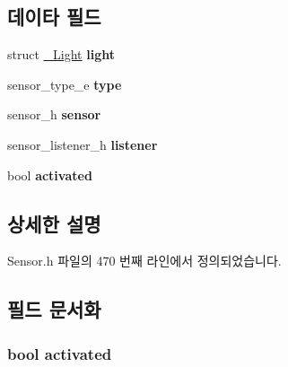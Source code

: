 \subsection*{데이타 필드}
\begin{DoxyCompactItemize}
\item 
\hypertarget{struct__LightExtend_ac99fe442698fe6dee34b12dae4f856b3}{struct \hyperlink{struct__Light}{\-\_\-\-Light} {\bfseries light}}\label{struct__LightExtend_ac99fe442698fe6dee34b12dae4f856b3}

\item 
\hypertarget{struct__LightExtend_abffb09766da2fc510a79bb51f82a36e1}{sensor\-\_\-type\-\_\-e {\bfseries type}}\label{struct__LightExtend_abffb09766da2fc510a79bb51f82a36e1}

\item 
\hypertarget{struct__LightExtend_a5bae9b7801bc3808411925cde81d3f26}{sensor\-\_\-h {\bfseries sensor}}\label{struct__LightExtend_a5bae9b7801bc3808411925cde81d3f26}

\item 
\hypertarget{struct__LightExtend_aa977dfb866b24fd7d9a20a9a01b2fd1f}{sensor\-\_\-listener\-\_\-h {\bfseries listener}}\label{struct__LightExtend_aa977dfb866b24fd7d9a20a9a01b2fd1f}

\item 
\hypertarget{struct__LightExtend_a73e9fa0c3543560192f38a8ab6a78c47}{bool {\bfseries activated}}\label{struct__LightExtend_a73e9fa0c3543560192f38a8ab6a78c47}

\end{DoxyCompactItemize}


\subsection{상세한 설명}


Sensor.\-h 파일의 470 번째 라인에서 정의되었습니다.



\subsection{필드 문서화}
\hypertarget{struct__LightExtend_a73e9fa0c3543560192f38a8ab6a78c47}{
\subsubsection[{activated}]{\setlength{\rightskip}{0pt plus 5cm}bool activated}}\label{struct__LightExtend_a73e9fa0c3543560192f38a8ab6a78c47}


